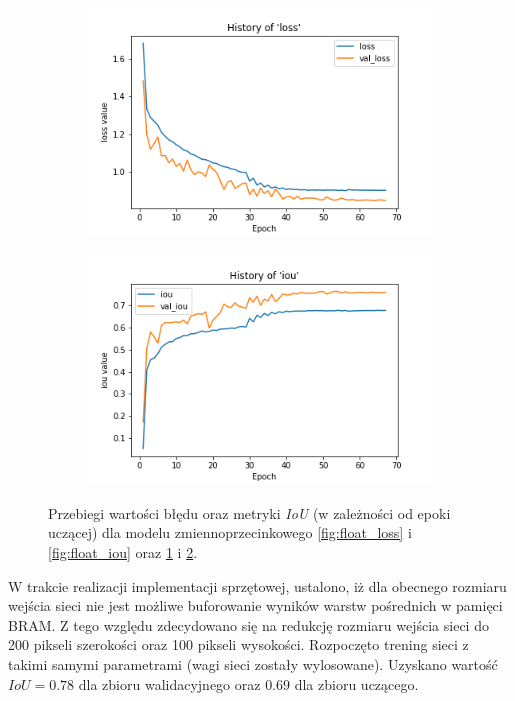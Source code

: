 \begin{figure}
\begin{subfigure}[b]{0.49\textwidth}
         \includegraphics[width=\textwidth]{images/8_bit_quant_hist_of_loss.png}
         \caption{}
         \label{fig:quant_loss}
     \end{subfigure}
     \hfill
     \begin{subfigure}[b]{0.49\textwidth}
         \centering
         \includegraphics[width=\textwidth]{images/8_bit_quant_hist_of_iou.png}
         \caption{}
         \label{fig:quant_iou}
     \end{subfigure}
     \hfill
     
    \caption{Przebiegi wartości błędu oraz metryki \emph{IoU} (w zależności od epoki uczącej) dla modelu zmiennoprzecinkowego \ref{fig:float_loss} i \ref{fig:float_iou} oraz \ref{fig:quant_loss} i \ref{fig:quant_iou}.}
    \label{fig:two_step_train}
\end{figure}


W trakcie realizacji implementacji sprzętowej, ustalono, iż dla obecnego rozmiaru wejścia sieci nie jest możliwe buforowanie wyników warstw pośrednich w pamięci BRAM.
Z tego względu zdecydowano się na redukcję rozmiaru wejścia sieci do 200 pikseli szerokości oraz 100 pikseli wysokości. 
Rozpoczęto trening sieci z takimi samymi parametrami (wagi sieci zostały wylosowane).  
Uzyskano wartość $IoU = 0.78$ dla zbioru walidacyjnego oraz $0.69$ dla zbioru uczącego.

